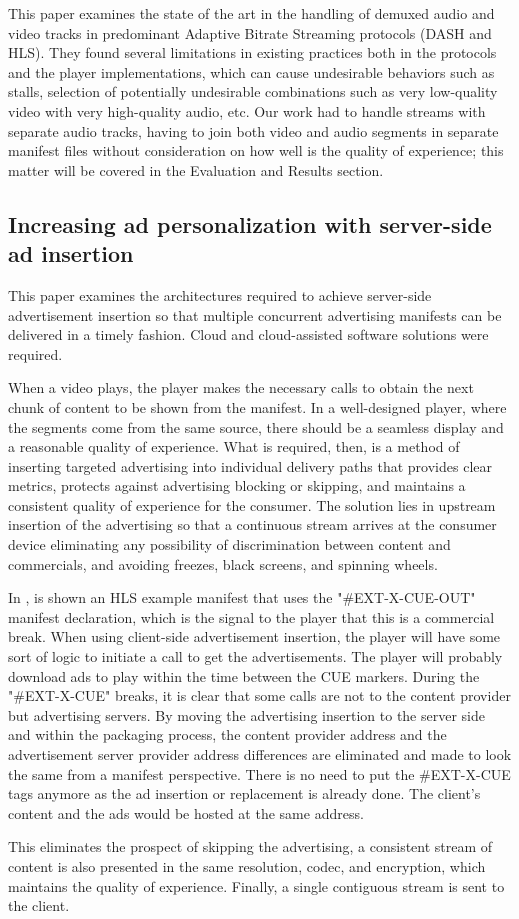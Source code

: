 This paper \cite{measures} examines the state of the art in the handling of demuxed audio and video tracks in predominant Adaptive Bitrate Streaming protocols (DASH and HLS). They found several limitations in existing practices both in the protocols and the player implementations, which can cause undesirable behaviors such as stalls, selection of potentially undesirable combinations such as very low-quality video with very high-quality audio, etc. Our work had to handle streams with separate audio tracks, having to join both video and audio segments in separate manifest files without consideration on how well is the quality of experience; this matter will be covered in the Evaluation and Results section.

\subsection{Increasing ad personalization with server-side ad insertion}

This paper \cite{ssai} examines the architectures required to achieve server-side advertisement insertion so that multiple concurrent advertising manifests can be delivered in a timely fashion. Cloud and cloud-assisted software solutions were required. 

When a video plays, the player makes the necessary calls to obtain the next chunk of content to be shown from the manifest. In a well-designed player, where the segments come from the same source, there should be a seamless display and a reasonable quality of experience. What is required, then, is a method of inserting targeted advertising into individual delivery paths that provides clear metrics, protects against advertising blocking or skipping, and maintains a consistent quality of experience for the consumer. The solution lies in upstream insertion of the advertising so that a continuous stream arrives at the consumer device eliminating any possibility of discrimination between content and commercials, and avoiding freezes, black screens, and spinning wheels.

In \cite{ssai}, is shown an HLS example manifest that uses the "#EXT-X-CUE-OUT" manifest declaration, which is the signal to the player that this is a commercial break. When using client-side advertisement insertion, the player will have some sort of logic to initiate a call to get the advertisements. The player will probably download ads to play within the time between the CUE markers. During the "\#EXT-X-CUE" breaks, it is clear that some calls are not to the content provider but advertising servers. By moving the advertising insertion to the server side and within the packaging process, the content provider address and the advertisement server provider address differences are eliminated and made to look the same from a manifest perspective. There is no need to put the #EXT-X-CUE tags anymore as the ad insertion or replacement is already done. The client's content and the ads would be hosted at the same address. 

This eliminates the prospect of skipping the advertising, a consistent stream of content is also presented in the same resolution, codec, and encryption, which maintains the quality of experience. Finally, a single contiguous stream is sent to the client.